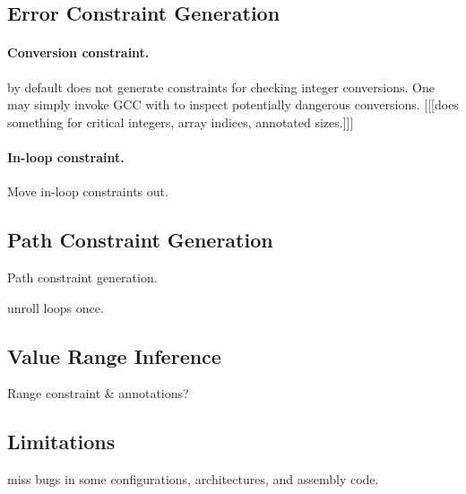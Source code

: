 \subsection{Error Constraint Generation}

\paragraph{Conversion constraint.}
\sys by default does not generate constraints for checking integer
conversions.  One may simply invoke GCC with  to
inspect potentially dangerous conversions.
[[[\sys does something for critical integers, array indices, annotated sizes.]]]

\paragraph{In-loop constraint.}
Move in-loop constraints out.

\subsection{Path Constraint Generation}

Path constraint generation.

unroll loops once.

\subsection{Value Range Inference}

Range constraint \& annotations?

\subsection{Limitations}

miss bugs in some configurations, architectures,
and assembly code.

